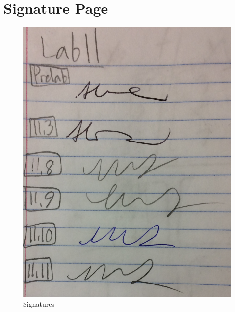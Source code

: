 \documentclass{article}
\begin{document}
\section{Signature Page}
\begin{figure}[H]
    \centering
    \includegraphics[scale = 0.15]{sig.jpg}
    \caption{Signatures}
    \label{fig:my_label}
\end{figure}



{}

\end{document}

